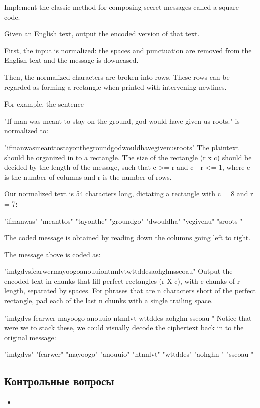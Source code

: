\documentclass[10pt,twoside,openany]{book}
\begin{document}
Implement the classic method for composing secret messages called a square code.

Given an English text, output the encoded version of that text.

First, the input is normalized: the spaces and punctuation are removed from the English text and the message is downcased.

Then, the normalized characters are broken into rows. These rows can be regarded as forming a rectangle when printed with intervening newlines.

For example, the sentence

"If man was meant to stay on the ground, god would have given us roots."
is normalized to:

"ifmanwasmeanttostayonthegroundgodwouldhavegivenusroots"
The plaintext should be organized in to a rectangle. The size of the rectangle (r x c) should be decided by the length of the message, such that c >= r and c - r <= 1, where c is the number of columns and r is the number of rows.

Our normalized text is 54 characters long, dictating a rectangle with c = 8 and r = 7:

"ifmanwas"
"meanttos"
"tayonthe"
"groundgo"
"dwouldha"
"vegivenu"
"sroots  "

The coded message is obtained by reading down the columns going left to right.

The message above is coded as:

"imtgdvsfearwermayoogoanouuiontnnlvtwttddesaohghnsseoau"
Output the encoded text in chunks that fill perfect rectangles (r X c), with c chunks of r length, separated by spaces. For phrases that are n characters short of the perfect rectangle, pad each of the last n chunks with a single trailing space.

"imtgdvs fearwer mayoogo anouuio ntnnlvt wttddes aohghn  sseoau "
Notice that were we to stack these, we could visually decode the ciphertext back in to the original message:

"imtgdvs"
"fearwer"
"mayoogo"
"anouuio"
"ntnnlvt"
"wttddes"
"aohghn "
"sseoau "

\subsection*{Контрольные вопросы}

\begin{itemize}
    \item
\end{itemize}
\end{document}
